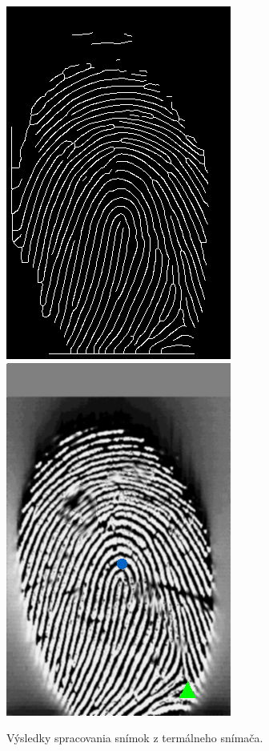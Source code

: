 \begin{figure}[h]
    \includegraphics[width=0.25\linewidth]{obrazky-figures/eval_results/termal_thin.png}\hfill
    \includegraphics[width=0.25\linewidth]{obrazky-figures/eval_results/termal_singularities.png}
    \caption{Výsledky spracovania snímok z termálneho snímača.}
    \label{obr:vyhodnotenie_termal}
  \end{figure}

